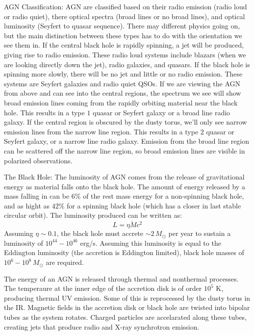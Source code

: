 AGN Classification:\newline
AGN are classified based on their radio emission (radio loud or radio quiet), 
there optical spectra (broad lines or no broad lines), and optical 
luminosity (Seyfert to quasar sequence).  There may different physics 
going on, but the main distinction between these types has to do with 
the orientation we see them in.  If the central black hole is rapidly 
spinning, a jet will be produced, giving rise to radio emission.  These 
radio loud systems include blazars (when we are looking directly down the 
jet), radio galaxies, and quasars.  If the black hole is spinning more 
slowly, there will be no jet and little or no radio emission.  These systems 
are Seyfert galaxies and radio quiet QSOs.  If we are viewing the AGN from 
above and can see into the central regions, the spectrum we see will show 
broad emission lines coming from the rapidly orbiting material near the 
black hole.  This results in a type $1$ quasar or Seyfert galaxy or a broad 
line radio galaxy.  If the central region is obscured by the dusty torus, 
we'll only see narrow emission lines from the narrow line region.  
This results in a type $2$ quasar or Seyfert galaxy, or a narrow line 
radio galaxy.  Emission from the broad line region can be scattered off the 
narrow line region, so broad emission lines are visible in polarized 
observations.  

The Black Hole:\newline
The luminosity of AGN comes from the release of gravitational energy as 
material falls onto the black hole.  The amount of energy released by a 
mass falling in can be $6$\% of the rest mass energy for a non-spinning 
black hole, and as hight as $42$\% for a spinning black hole (which has 
a closer in last stable circular orbit).  The luminosity produced can 
be written as:
\begin{equation}
L=\eta \dot{M}c^2
\end{equation}
Assuming $\eta\sim0.1$, the black hole must accrete $\sim2\,M_{\odot}$ per 
year to sustain a luminosity of $10^{44}-10^{46}$ erg/s.  Assuming this 
luminosity is equal to the Eddington luminosity (the accretion is Eddington 
limited), black hole masses of $10^6-10^8\,M_{\odot}$ are required.  

The energy of an AGN is released through thermal and nonthermal processes.  
The temperaure at the inner edge of the accretion disk is of order $10^5$ K, 
producing thermal UV emission.  Some of this is reprocessed by 
the dusty torus in the IR.  Magnetic fields in the accretion disk or black hole 
are twisted into bipolar tubes as the system rotates.  Charged particles 
are accelarated along these tubes, creating jets that produce 
radio and X-ray synchrotron emission.  

